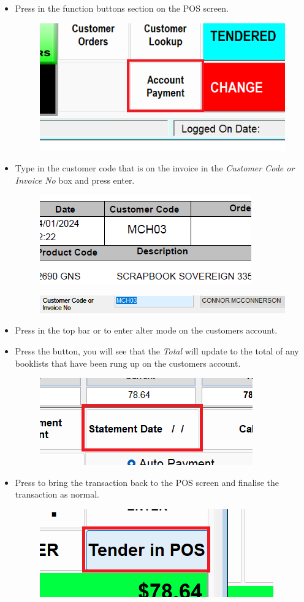 \documentclass[a4paper, 12pt]{article}
\begin{document}
\begin{itemize}
    \item Press  in the function buttons section on the POS screen.
    \begin{figure}[h]
        \centering
        \includegraphics[width=0.3\linewidth]{images/accountpayment.png}
    \end{figure}
    \item Type in the customer code that is on the invoice in the \textit{Customer Code or Invoice No} box and press enter.
    \begin{figure}[h]
        \centering
        \includegraphics[width=0.3\linewidth]{images/invoicecustomercode.png}
    \end{figure}
    \begin{figure}[h]
        \centering
        \includegraphics[width=0.7\linewidth]{images/accountcode.png}
    \end{figure}
    \item Press  in the top bar or  to enter alter mode on the customers account.
    \item Press the  button, you will see that the \textit{Total} will update to the total of any booklists that have been rung up on the customers account.
    \begin{figure}[h!]
        \centering
        \includegraphics[width=0.3\linewidth]{images/statementdate.png} 
    \end{figure}
    \item Press  to bring the transaction back to the POS screen and finalise the transaction as normal.
    \begin{figure}[h!]
        \centering
        \includegraphics[width=0.3\linewidth]{images/tenderinpos.png}
    \end{figure}
\end{itemize}
\end{document}
